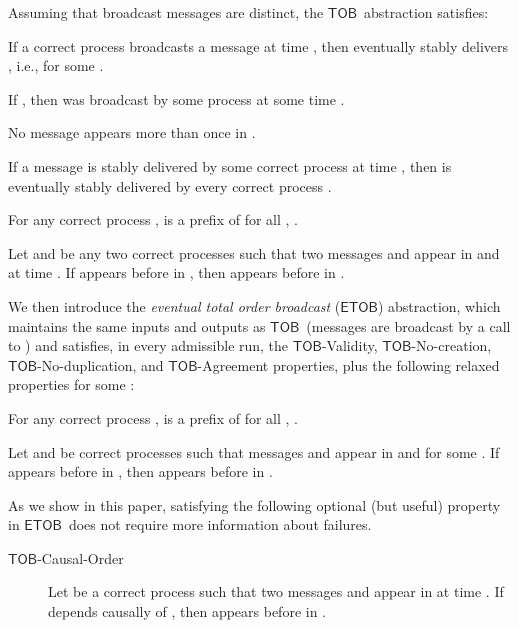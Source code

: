 \documentclass[11pt]{article}
\newcommand{\ETOB}{\ensuremath{\mathsf{ETOB}}}
\newcommand{\TOB}{\ensuremath{\mathsf{TOB}}}
\begin{document}
Assuming that broadcast messages are distinct, the \TOB~abstraction satisfies:
\begin{description}\itemsep0pt
\item[\TOB-Validity] If a correct process  broadcasts a message
   at time , then  eventually stably delivers , i.e.,   for some .

\item[\TOB-No-creation] If , then  was broadcast by
  some process  at some time .

\item[\TOB-No-duplication] No message appears more than once in
  . 

\item[\TOB-Agreement] If a message  is stably delivered by some
  correct process  at time , then  is eventually stably delivered by every correct process .

\item[\TOB-Stability] For any correct process ,  is a prefix of  for all , .

\item[\TOB-Total-order] Let  and  be any two correct processes such that two messages  and  appear in  and  at time . If  appears before  in , then  appears before  in .
\end{description}
We then introduce the \emph{eventual  total order broadcast} (\ETOB)
abstraction, which  maintains the same inputs and outputs as \TOB~(messages are broadcast by a call to ) and
satisfies, in every admissible run,
the \TOB-Validity, \TOB-No-creation, \TOB-No-duplication, and
\TOB-Agreement properties,
plus the following relaxed properties for some :
\begin{description}\itemsep0pt
\item[\ETOB-Stability] For any correct process ,  is a prefix of 
  for all , .
\item[\ETOB-Total-order] Let   and  be correct processes such that
  messages  and  appear in  and  for some
  . If  appears before  in , then  appears before  in .
\end{description}
As we show in this paper, satisfying the following optional (but
useful) property in \ETOB~does not require more information about failures.
\begin{description}
\item[\TOB-Causal-Order] Let  be a correct process such that two messages  and  appear in  at time . If  depends causally of , then  appears before  in .
\end{description}
\end{document}
